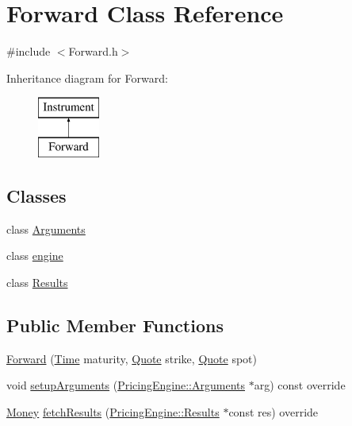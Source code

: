 \hypertarget{class_forward}{}\section{Forward Class Reference}
\label{class_forward}


{\ttfamily \#include $<$Forward.\+h$>$}

Inheritance diagram for Forward\+:\begin{figure}[H]
\begin{center}
\leavevmode
\includegraphics[height=2.000000cm]{class_forward}
\end{center}
\end{figure}
\subsection*{Classes}
\begin{DoxyCompactItemize}
\item 
class \hyperlink{class_forward_1_1_arguments}{Arguments}
\item 
class \hyperlink{class_forward_1_1engine}{engine}
\item 
class \hyperlink{class_forward_1_1_results}{Results}
\end{DoxyCompactItemize}
\subsection*{Public Member Functions}
\begin{DoxyCompactItemize}
\item 
\hyperlink{class_forward_a7ec14e1a089290cae0e70c4cddd353b5}{Forward} (\hyperlink{_name_def_8h_ac2d3e0ba793497bcca555c7c2cf64ff3}{Time} maturity, \hyperlink{_name_def_8h_a642a6c5fd87319d922637de0e0bb0305}{Quote} strike, \hyperlink{_name_def_8h_a642a6c5fd87319d922637de0e0bb0305}{Quote} spot)
\item 
void \hyperlink{class_forward_ad6208ba4ee03c396e611c142be735b26}{setup\+Arguments} (\hyperlink{class_pricing_engine_1_1_arguments}{Pricing\+Engine\+::\+Arguments} $\ast$arg) const override
\item 
\hyperlink{_name_def_8h_a5a9d48c16a694e9a2d9f1eca730dc8c5}{Money} \hyperlink{class_forward_ab1e2edeb8345c8605013634a598d1ae5}{fetch\+Results} (\hyperlink{class_pricing_engine_1_1_results}{Pricing\+Engine\+::\+Results} $\ast$const res) override
\end{DoxyCompactItemize}
